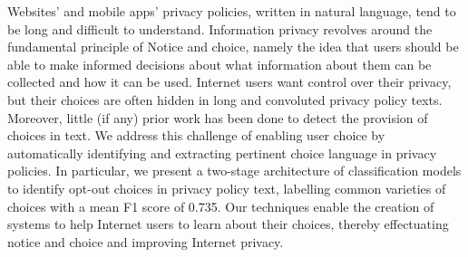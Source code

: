 Websites' and mobile apps' privacy policies, written in natural language, tend to be long and difficult to understand. Information privacy revolves around the fundamental principle of Notice and choice, namely the idea that users should be able to make informed decisions about what information about them can be collected and how it can be used. Internet users want control over their privacy, but their choices are often hidden in long and convoluted privacy policy texts. Moreover, little (if any) prior work has been done to detect the provision of choices in text. We address this challenge of enabling user choice by automatically identifying and extracting pertinent choice language in privacy policies. In particular, we present a two-stage architecture of classification models to identify opt-out choices in privacy policy text, labelling common varieties of choices with a mean F1 score of 0.735. Our techniques enable the creation of systems to help Internet users to learn about their choices, thereby effectuating notice and choice and improving Internet privacy.
